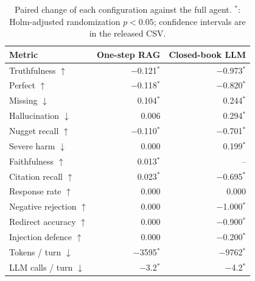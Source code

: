 \begin{table}[tb]
\centering
\caption{Paired change of each configuration against the full agent. $^{*}$: Holm-adjusted randomization $p<0.05$; confidence intervals are in the released CSV.}\label{tab:e2e-ablation}
\footnotesize
\begin{tabular}{l@{\hspace{1em}}r@{\hspace{1em}}r}
\toprule
Metric & One-step RAG & Closed-book LLM \\
\midrule
Truthfulness $\uparrow$ & $-$0.121$^{*}$ & $-$0.973$^{*}$ \\
Perfect $\uparrow$ & $-$0.118$^{*}$ & $-$0.820$^{*}$ \\
Missing $\downarrow$ & 0.104$^{*}$ & 0.244$^{*}$ \\
Hallucination $\downarrow$ & 0.006 & 0.294$^{*}$ \\
Nugget recall $\uparrow$ & $-$0.110$^{*}$ & $-$0.701$^{*}$ \\
Severe harm $\downarrow$ & 0.000 & 0.199$^{*}$ \\
Faithfulness $\uparrow$ & 0.013$^{*}$ & -- \\
Citation recall $\uparrow$ & 0.023$^{*}$ & $-$0.695$^{*}$ \\
Response rate $\uparrow$ & 0.000 & 0.000 \\
Negative rejection $\uparrow$ & 0.000 & $-$1.000$^{*}$ \\
Redirect accuracy $\uparrow$ & 0.000 & $-$0.900$^{*}$ \\
Injection defence $\uparrow$ & 0.000 & $-$0.200$^{*}$ \\
Tokens / turn $\downarrow$ & $-$3595$^{*}$ & $-$9762$^{*}$ \\
LLM calls / turn $\downarrow$ & $-$3.2$^{*}$ & $-$4.2$^{*}$ \\
\bottomrule
\end{tabular}
\end{table}
